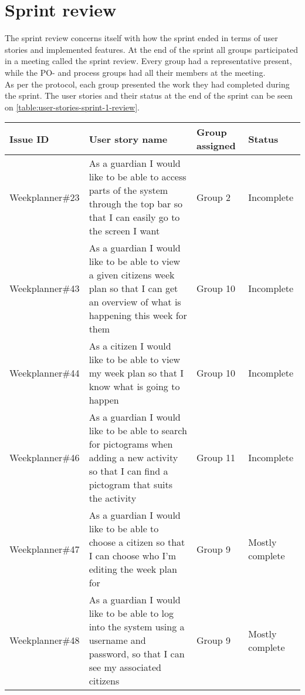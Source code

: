 \section{Sprint review}\label{sprint-1-review}
The sprint review concerns itself with how the sprint ended in terms of user stories and implemented features.
At the end of the sprint all groups participated in a meeting called the sprint review.
Every group had a representative present, while the PO- and process groups had all their members at the meeting.
\\
As per the protocol, each group presented the work they had completed during the sprint. The user stories and their status at the end of the sprint can be seen on \autoref{table:user-stories-sprint-1-review}.

\begin{longtable}{|p{2.8cm}|p{7cm}|p{1.6cm}|p{2cm}|}
    \hline
    Issue ID        & User story name                                                                                                                                                          & Group assigned  & Status     \\ \hline
    Weekplanner\#23 & As a guardian I would like to be able to access parts of the system through the top bar so that I can easily go to the screen I want                                     & Group 2         & Incomplete  \\ \hline
    Weekplanner\#43 & As a guardian I would like to be able to view a given citizens week plan so that I can get an overview of what is happening this week for them                           & Group 10        & Incomplete     \\ \hline
    Weekplanner\#44 & As a citizen I would like to be able to view my week plan so that I know what is going to happen                                                                         & Group 10        & Incomplete       \\ \hline
    Weekplanner\#46 & As a guardian I would like to be able to search for pictograms when adding a new activity so that I can find a pictogram that suits the activity                         & Group 11        & Incomplete      \\ \hline
    Weekplanner\#47 & As a guardian I would like to be able to choose a citizen so that I can choose who I’m editing the week plan for                                                         & Group 9         & Mostly complete    \\ \hline
    Weekplanner\#48 & As a guardian I would like to be able to log into the system using a username and password, so that I can see my associated citizens                                     & Group 9         & Mostly complete    \\ \hline

\end{longtable}
